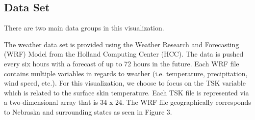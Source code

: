 \documentclass[journal]{vgtc}                %
\begin{document}
\subsection{Data Set}

There are two main data groups in this visualization. 

The weather data set is provided using the Weather Research and Forecasting (WRF) Model from the Holland Computing Center (HCC). The data is pushed every six hours with a forecast of up to 72 hours in the future. Each WRF file contains multiple variables in regards to weather (i.e. temperature, precipitation, wind speed, etc.). For this visualization, we choose to focus on the TSK variable which is related to the surface skin temperature. Each TSK file is represented via a two-dimensional array that is 34 x 24. The WRF file geographically corresponds to Nebraska and surrounding states as seen in Figure 3.
\end{document}
